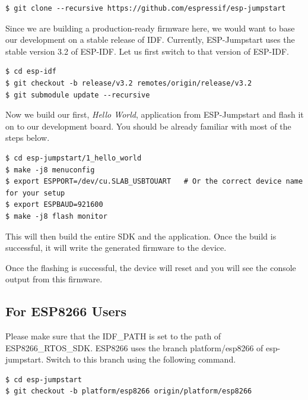\documentclass[main.tex]{subfiles}
\begin{document}
\begin{verbatim}
$ git clone --recursive https://github.com/espressif/esp-jumpstart
\end{verbatim}

Since we are building a production-ready firmware here, we would want to base our development on a stable release of IDF. Currently, ESP-Jumpstart uses the stable version 3.2 of ESP-IDF. Let us first switch to that version of ESP-IDF.
\begin{verbatim}
$ cd esp-idf
$ git checkout -b release/v3.2 remotes/origin/release/v3.2
$ git submodule update --recursive
\end{verbatim}

Now we build our first, \textit{Hello World}, application from ESP-Jumpstart and flash it on to our development board. You should be already familiar with most of the steps below.

\begin{verbatim}
$ cd esp-jumpstart/1_hello_world
$ make -j8 menuconfig
$ export ESPPORT=/dev/cu.SLAB_USBTOUART   # Or the correct device name for your setup
$ export ESPBAUD=921600
$ make -j8 flash monitor
\end{verbatim}

This will then build the entire SDK and the application. Once the build is successful, it will write the generated firmware to the device.


Once the flashing is successful, the device will reset and you will see the console output from this firmware.

\subsection{For ESP8266 Users}\label{sec:for_esp8266_users}
Please make sure that the IDF\_PATH is set to the path of ESP8266\_RTOS\_SDK. ESP8266 uses the branch platform/esp8266 of esp-jumpstart. Switch to this branch using the following command.

\begin{verbatim}
$ cd esp-jumpstart
$ git checkout -b platform/esp8266 origin/platform/esp8266
\end{verbatim}
\end{document}
